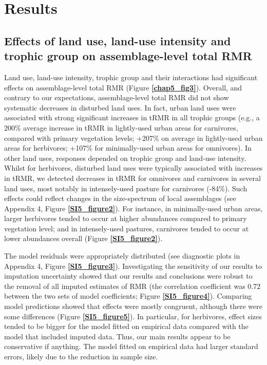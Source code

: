 \section{Results}

\subsection{Effects of land use, land-use intensity and trophic group on assemblage-level total RMR}

Land use, land-use intensity, trophic group and their interactions had significant effects on assemblage-level total RMR (Figure \textbf{\ref{chap5_fig3}}). Overall, and contrary to our expectations, assemblage-level total RMR did not show systematic decreases in disturbed land uses. In fact, urban land uses were associated with strong significant increases in tRMR in all trophic groups (e.g., a 200\% average increase in tRMR in lightly-used urban areas for carnivores, compared with primary vegetation levels; +207\% on average in lightly-used urban areas for herbivores; +107\% for minimally-used urban areas for omnivores). In other land uses, responses depended on trophic group and land-use intensity. Whilst for herbivores, disturbed land uses were typically associated with increases in tRMR, we detected decreases in tRMR for omnivores and carnivores in several land uses, most notably in intensely-used pasture for carnivores (-84\%). Such effects could reflect changes in the size-spectrum of local assemblages (see Appendix 4, Figure \textbf{\ref{SI5_figure2}}). For instance, in minimally-used urban areas, larger herbivores tended to occur at higher abundances compared to primary vegetation level; and in intensely-used pastures, carnivores tended to occur at lower abundances overall (Figure \textbf{\ref{SI5_figure2}}).

\vspace{0.5cm}
The model residuals were appropriately distributed (see diagnostic plots in Appendix 4, Figure \textbf{\ref{SI5_figure3}}). Investigating the sensitivity of our results to imputation uncertainty showed that our results and conclusions were robust to the removal of all imputed estimates of RMR (the correlation coefficient was 0.72 between the two sets of model coefficients; Figure \textbf{\ref{SI5_figure4}}). Comparing model predictions showed that effects were mostly congruent, although there were some differences (Figure \textbf{\ref{SI5_figure5}}). In particular, for herbivores, effect sizes tended to be bigger for the model fitted on empirical data compared with the model that included imputed data. Thus, our main results appear to be conservative if anything. The model fitted on empirical data had larger standard errors, likely due to the reduction in sample size. 


